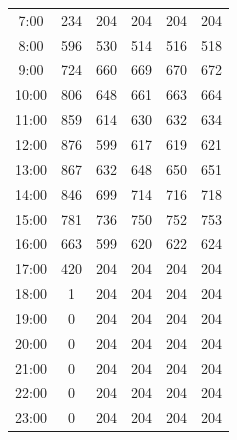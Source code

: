 \begin{longtable}[c]{cccccc}
7:00  & 234 & 204          & 204               & 204                & 204                   \\ 
8:00  & 596 & 530          & 514               & 516                & 518                   \\ 
9:00  & 724 & 660          & 669               & 670                & 672                   \\ 
10:00 & 806 & 648          & 661               & 663                & 664                   \\ 
11:00 & 859 & 614          & 630               & 632                & 634                   \\ 
12:00 & 876 & 599          & 617               & 619                & 621                   \\ 
13:00 & 867 & 632          & 648               & 650                & 651                   \\ 
14:00 & 846 & 699          & 714               & 716                & 718                   \\ 
15:00 & 781 & 736          & 750               & 752                & 753                   \\ 
16:00 & 663 & 599          & 620               & 622                & 624                   \\ 
17:00 & 420 & 204          & 204               & 204                & 204                   \\ 
18:00 & 1   & 204          & 204               & 204                & 204                   \\ 
19:00 & 0   & 204          & 204               & 204                & 204                   \\ 
20:00 & 0   & 204          & 204               & 204                & 204                   \\ 
21:00 & 0   & 204          & 204               & 204                & 204                   \\ 
22:00 & 0   & 204          & 204               & 204                & 204                   \\ 
23:00 & 0   & 204          & 204               & 204                & 204                   \\
\end{longtable}

